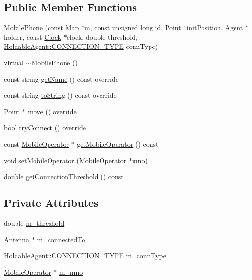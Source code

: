 \subsection*{Public Member Functions}
\begin{DoxyCompactItemize}
\item 
\mbox{\hyperlink{class_mobile_phone_afd7beed70eb2af3baecd9521332ba8eb}{Mobile\+Phone}} (const \mbox{\hyperlink{class_map}{Map}} $\ast$m, const unsigned long id, Point $\ast$init\+Position, \mbox{\hyperlink{class_agent}{Agent}} $\ast$holder, const \mbox{\hyperlink{class_clock}{Clock}} $\ast$clock, double threshold, \mbox{\hyperlink{class_holdable_agent_ae2c334b004d7b9c5a999cf2618e4e518}{Holdable\+Agent\+::\+C\+O\+N\+N\+E\+C\+T\+I\+O\+N\+\_\+\+T\+Y\+PE}} conn\+Type)
\item 
virtual \mbox{\hyperlink{class_mobile_phone_a51db1d9b4fcc52ea9f8d613dae4f6a4b}{$\sim$\+Mobile\+Phone}} ()
\item 
const string \mbox{\hyperlink{class_mobile_phone_a1eeac3141baafa75ebcf26fc3a0e4068}{get\+Name}} () const override
\item 
const string \mbox{\hyperlink{class_mobile_phone_a2b7e556d12a43e380786ad0eccf3ce04}{to\+String}} () const override
\item 
Point $\ast$ \mbox{\hyperlink{class_mobile_phone_a785d0cac08252386603c702ad8f38c5b}{move}} () override
\item 
bool \mbox{\hyperlink{class_mobile_phone_ad91afa811cea8ee124167f5941bcda1b}{try\+Connect}} () override
\item 
const \mbox{\hyperlink{class_mobile_operator}{Mobile\+Operator}} $\ast$ \mbox{\hyperlink{class_mobile_phone_aba72025d08c382d8533e0cbb9166999b}{get\+Mobile\+Operator}} () const
\item 
void \mbox{\hyperlink{class_mobile_phone_ad4db8203e8f2e974733357d7c3e6cf28}{set\+Mobile\+Operator}} (\mbox{\hyperlink{class_mobile_operator}{Mobile\+Operator}} $\ast$mno)
\item 
double \mbox{\hyperlink{class_mobile_phone_a57475711a8f85086f50067d219f1181d}{get\+Connection\+Threshold}} () const
\end{DoxyCompactItemize}
\subsection*{Private Attributes}
\begin{DoxyCompactItemize}
\item 
double \mbox{\hyperlink{class_mobile_phone_afb6364675f7cf6e09856f49ae6c10563}{m\+\_\+threshold}}
\item 
\mbox{\hyperlink{class_antenna}{Antenna}} $\ast$ \mbox{\hyperlink{class_mobile_phone_aa143b94346485788c3563228f6043721}{m\+\_\+connected\+To}}
\item 
\mbox{\hyperlink{class_holdable_agent_ae2c334b004d7b9c5a999cf2618e4e518}{Holdable\+Agent\+::\+C\+O\+N\+N\+E\+C\+T\+I\+O\+N\+\_\+\+T\+Y\+PE}} \mbox{\hyperlink{class_mobile_phone_a39f69fef45f380e3922dfe78b904372d}{m\+\_\+conn\+Type}}
\item 
\mbox{\hyperlink{class_mobile_operator}{Mobile\+Operator}} $\ast$ \mbox{\hyperlink{class_mobile_phone_a1b26abc840ac8f8679dd62939330c597}{m\+\_\+mno}}
\end{DoxyCompactItemize}
